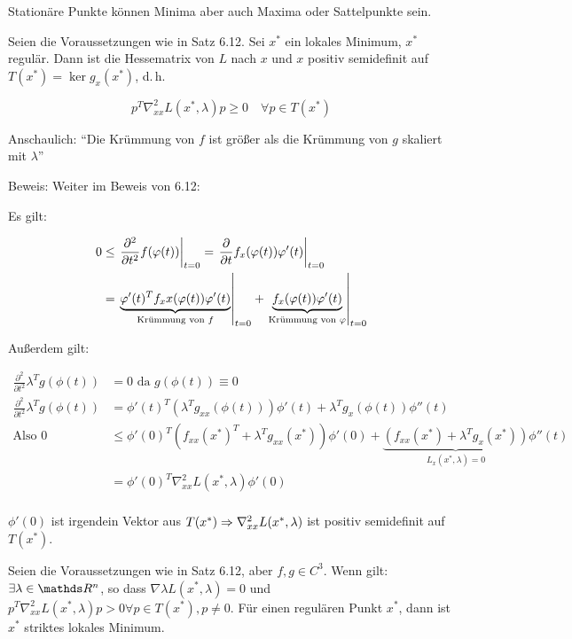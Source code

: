 
Stationäre Punkte können Minima aber auch Maxima oder Sattelpunkte sein.


Seien die Voraussetzungen wie in Satz 6.12. Sei $x^*$ ein lokales Minimum, $x^*$ regulär. Dann ist die Hessematrix von $L$ nach $x$ und $x$ positiv semidefinit auf $T(x^*) = \ker g_x(x^*)$, d.\,h.

\[ p^T \nabla_{xx}^2 L(x^*, \lambda) p \geq 0 \quad \forall p \in T(x^*) \]

Anschaulich: "`Die Krümmung von $f$ ist größer als die Krümmung von $g$ skaliert mit $\lambda$"'

Beweis: Weiter im Beweis von 6.12:

Es gilt:

\begin{align*}
0 &\leq \left. \frac{\partial^2}{\partial t^2} f(\varphi(t)) \right|_{t=0} = \left. \frac{\partial}{\partial t} f_x(\varphi(t)) \varphi'(t) \right|_{t=0} \\
&= \left. \underbrace{ \varphi'(t)^T f_xx(\varphi(t)) \varphi'(t)}_{\text{Krümmung von } f} \right|_{t=0} + \left. \underbrace{f_x(\varphi(t)) \varphi'(t)}_{\text{Krümmung von } \varphi} \right|_{t=0} \\
\end{align*}

Außerdem gilt:

\begin{align*}
\frac{\partial^2}{\partial t^2} \lambda^T g(\phi(t)) &= 0 \text{ da } g(\phi(t)) \equiv 0 \\
\frac{\partial^2}{\partial t^2} \lambda^T g(\phi(t)) &= \phi'(t)^T (\lambda^T g_{xx} (\phi(t))) \phi'(t) + \lambda^T g_x(\phi(t)) \phi''(t) \\
\text{Also } 0 & \leq \phi'(0)^T (f_{xx} (x^*)^T + \lambda^T g_{xx}(x^*)) \phi'(0) + \underbrace{(f_{xx}(x^*) + \lambda^T g_x(x^*))}_{L_{x} (x^*, \lambda) = 0} \phi''(t) \\
&= \phi'(0)^T \nabla_{xx}^2 L(x^*, \lambda) \phi'(0) \\
\end{align*}

$\phi'(0)$ ist irgendein Vektor aus $T(x^*) \Rightarrow \nabla_{xx}^2 L(x^*, \lambda)$ ist positiv semidefinit auf $T(x^*)$.


Seien die Voraussetzungen wie in Satz 6.12, aber $f,g\in C^3$. Wenn gilt: $\exists \lambda \in \R^n$, so dass $\nabla \lambda L(x^*, \lambda) = 0$ und $p^T \nabla_{xx}^2 L(x^*, \lambda) p > 0 \forall p \in T(x^*), p \neq 0$. Für einen regulären Punkt $x^*$, dann ist $x^*$ striktes lokales Minimum.

